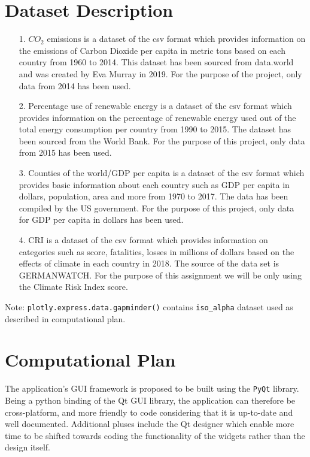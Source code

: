 \documentclass[fontsize=11pt]{article}
\begin{document}
\section*{Dataset Description}

\begin{enumerate}
 \item [1.] $CO_2$ emissions is a dataset of the csv format which provides information on the emissions of Carbon Dioxide per capita in metric tons based on each country from 1960 to 2014.
 This dataset has been sourced from data.world and was created by Eva Murray in 2019.
 For the purpose of the project, only data from 2014 has been used.
 \item[2.] Percentage use of renewable energy is a dataset of the csv format which provides information on the percentage of  renewable energy used out of the total energy consumption per country from 1990 to 2015.
 The dataset has been sourced from the World Bank.
 For the purpose of this project, only data from 2015 has been used.
 \item[3.] Counties of the world/GDP per capita is a dataset of the csv format which provides basic information about each country such as GDP per capita in dollars, population, area and more from 1970 to 2017. The data has been compiled by the US government.
 For the purpose of this project, only data for GDP per capita in dollars has been used.
 \item[4.] CRI is a dataset of the csv format which provides information on categories such as score, fatalities, losses in millions of dollars based on the effects of climate in each country in 2018.
 The source of the data set is GERMANWATCH. For the purpose of this assignment we will be only using the Climate Risk Index score.
\end{enumerate}

Note: \texttt{plotly.express.data.gapminder()} contains \texttt{iso\_alpha} dataset used as described in computational plan.

\section*{Computational Plan}

The application's GUI framework is proposed to be built using the \texttt{PyQt} library.
Being a python binding of the Qt GUI library, the application can therefore be cross-platform, and more friendly to code
considering that it is up-to-date and well documented.
Additional pluses include the Qt designer which enable more time to be shifted towards coding the functionality of the
widgets rather than the design itself. \newline
\end{document}
